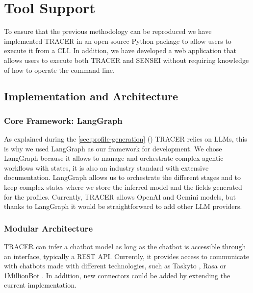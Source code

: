 
\chapter{Tool Support}\label{chapter:tool_support}

To ensure that the previous methodology can be reproduced
we have implemented \acf{TRACER} in an open-source Python package
to allow users to execute it from a \ac{CLI}.
In addition, we have developed a web application
that allows users to execute both \ac{TRACER} and SENSEI
without requiring knowledge of how to operate the command line.


\section{Implementation and Architecture}

\subsection{Core Framework: LangGraph}

As explained during the \autoref{sec:profile-generation} ()
\ac{TRACER} relies on \acp{LLM},
this is why we used LangGraph \autocite{LangGraph} as our framework for development.
We chose LangGraph because
it allows to manage and orchestrate
complex agentic workflows with states,
it is also an industry standard with extensive documentation.
LangGraph allows us to orchestrate the different stages
and to keep complex states where we store
the inferred model and the fields generated for the profiles.
Currently, \ac{TRACER} allows OpenAI and Gemini models,
but thanks to LangGraph it would be straightforward to add other \ac{LLM} providers.

\subsection{Modular Architecture}

\ac{TRACER} can infer a chatbot model as long as
the chatbot is accessible through an interface, typically a \acs{REST} \acs{API}.
Currently, it provides access to communicate with chatbots made with different technologies,
such as Taskyto \autocite{sanchezcuadradoAutomatingDevelopmentTaskoriented2024}, Rasa \autocite{Rasa2020} or 1MillionBot \autocite{1MillionBot}.
In addition, new connectors could be added by extending the current implementation.

